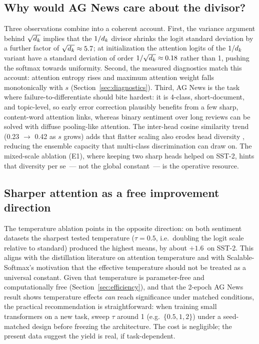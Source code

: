\subsection{Why would AG News care about the divisor?}\label{sec:why-agnews}
Three observations combine into a coherent account. First, the variance argument
behind $\sqrt{d_k}$ \cite{vaswani2017} implies that the $1/d_k$ divisor shrinks
the logit standard deviation by a further factor of $\sqrt{d_k} \approx 5.7$;
at initialization the attention logits of the $1/d_k$ variant have a standard
deviation of order $1/\sqrt{d_k} \approx 0.18$ rather than 1, pushing the softmax
towards uniformity. Second, the measured diagnostics match this account:
attention entropy rises and maximum attention weight falls monotonically with
$s$ (Section~\ref{sec:diagnostics}). Third, AG News is the task where
failure-to-differentiate should bite hardest: it is 4-class, short-document, and
topic-level, so early error correction plausibly benefits from a few sharp,
content-word attention links, whereas binary sentiment over long reviews can be
solved with diffuse pooling-like attention. The inter-head cosine similarity
trend (0.23 $\to$ 0.42 as $s$ grows) adds that flatter scaling also erodes
head diversity \cite{voita2019,michel2019}, reducing the ensemble capacity that
multi-class discrimination can draw on. The mixed-scale ablation (E1), where
keeping two sharp heads helped on SST-2, hints that diversity per se~--- not the
global constant~--- is the operative resource.

\subsection{Sharper attention as a free improvement direction}\label{sec:sharper}
The temperature ablation points in the opposite direction: on both sentiment
datasets the sharpest tested temperature ($\tau = 0.5$, i.e.\ doubling the logit
scale relative to standard) produced the highest means, by about $+1.6$\,\pp{} on
SST-2. This aligns with the distillation literature on attention temperature
\cite{zhang2022temp,hinton2015} and with Scalable-Softmax's motivation
\cite{nakanishi2025} that the effective temperature should not be treated as a
universal constant. Given that temperature is parameter-free and computationally
free (Section~\ref{sec:efficiency}), and that the 2-epoch AG News result shows
temperature effects \emph{can} reach significance under matched conditions, the
practical recommendation is straightforward: when training small transformers on
a new task, sweep $\tau$ around 1 (e.g.\ $\{0.5, 1, 2\}$) under a seed-matched
design before freezing the architecture. The cost is negligible; the present
data suggest the yield is real, if task-dependent.

